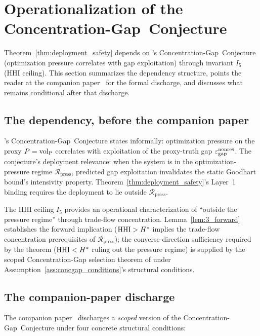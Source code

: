 \section{Operationalization of the Concentration-Gap~Conjecture}
\label{sec:conjecture_op}

Theorem~\ref{thm:deployment_safety} depends on
\citep[Microfoundation]{lasser2026micro}'s Concentration-Gap~Conjecture
(optimization pressure correlates with gap exploitation) through invariant
$I_5$ (HHI ceiling).  This section summarizes the dependency
structure, points the reader at the companion
paper~\citep{lasser2026foundations} for the formal discharge, and
discusses what remains conditional after that discharge.

\subsection{The dependency, before the companion paper}

\citep[Microfoundation]{lasser2026micro}'s Concentration-Gap~Conjecture
states informally: optimization pressure on the proxy $P =
{\operatorname{vol}_{\mathrm{P}}}$ correlates with exploitation of the proxy-truth gap
$\varepsilon_{\mathrm{gap}}^{\mathrm{nonres}}$.  The conjecture's deployment relevance: when the
system is in the optimization-pressure regime
$\mathcal{R}_{\mathrm{press}}$, predicted gap exploitation
invalidates the static Goodhart bound's intensivity property.
Theorem~\ref{thm:deployment_safety}'s Layer~1 binding requires the
deployment to lie outside $\mathcal{R}_{\mathrm{press}}$.

The HHI ceiling $I_5$ provides an operational characterization of
``outside the pressure regime'' through trade-flow concentration.
Lemma~\ref{lem:3_forward} establishes the forward implication
($\mathrm{HHI} > H^*$ implies the trade-flow concentration prerequisites
of $\mathcal{R}_{\mathrm{press}}$); the converse-direction
sufficiency required by the theorem ($\mathrm{HHI} < H^*$ ruling out the
pressure regime) is supplied by the scoped Concentration-Gap
selection theorem of \citep[Theorem~2]{lasser2026foundations}
under Assumption~\ref{ass:concgap_conditions}'s structural
conditions.

\subsection{The companion-paper discharge}

The companion paper~\citep{lasser2026foundations} discharges a
\emph{scoped} version of the Concentration-Gap~Conjecture under
four concrete structural conditions:

